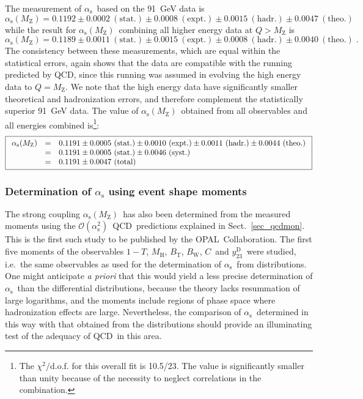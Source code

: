 \documentclass[12pt,a4paper,twoside]{article}
\newcommand{\as}     {\ensuremath{\alpha_{\mathrm{s}}}}
\newcommand{\asmz}   {\ensuremath{\alpha_{\mathrm{s}}(\mz)}}
\newcommand{\oaa}    {\ensuremath{\mathcal{O}(\alpha_{\mathrm{s}}^2)}}
\newcommand{\mz}     {\ensuremath{M_{\mathrm{Z}}}}
\newcommand{\bt}     {\ensuremath{B_{\mathrm{T}}}}
\newcommand{\bw}     {\ensuremath{B_{\mathrm{W}}}}
\newcommand{\cp}     {\ensuremath{C}}
\newcommand{\mh}     {\ensuremath{M_{\mathrm{H}}}}
\newcommand{\thr}    {\ensuremath{1-T}}
\newcommand{\ytwothree}   {\ensuremath{y^{\mathrm{D}}_{23}}}
\newcommand{\bm}[1]  {\mbox{\boldmath\ensuremath{#1}}}
\newcommand{\Opal}{\mbox{\rm OPAL}}
\newcommand{\qcd}{\mbox{QCD}}
\newcommand{\dof}{\mbox{d.o.f.}}
\begin{document}
The measurement of \as\ based on the 91~GeV data is
\[
\asmz =  0.1192
\pm0.0002~\mathrm{(stat.)}
\pm0.0008~\mathrm{(expt.)}
\pm0.0015~\mathrm{(hadr.)}
\pm0.0047~\mathrm{(theo.)} 
\]
while the result for \asmz\ combining all 
higher energy data at $Q>\mz$ is
\[
\asmz =  0.1189
\pm0.0011~\mathrm{(stat.)}
\pm0.0015~\mathrm{(expt.)}
\pm0.0008~\mathrm{(hadr.)}
\pm0.0040~\mathrm{(theo.)}\;. 
\]
The consistency between these measurements, which are equal within the 
statistical errors, 
again shows that the data are 
compatible with the running predicted by 
\qcd, since this running was assumed in evolving the
high energy data to $Q=\mz$.  We note that the high energy 
data have significantly smaller theoretical and hadronization
errors, and therefore complement the statistically superior
91~GeV data.
The value of \asmz\ obtained from
all observables and all energies combined 
is\footnote{The $\chi^2/\dof$ for this overall fit is 10.5/23. The value
is significantly smaller than unity because of the necessity to 
neglect correlations in the combination.}:
{\small
\begin{displaymath}
\fbox{$\begin{array}{rcl}
\asmz & = & 0.1191
\pm0.0005~\mathrm{(stat.)}
\pm0.0010~\mathrm{(expt.)}
\pm0.0011~\mathrm{(hadr.)}
\pm0.0044~\mathrm{(theo.)}\\
& = & 0.1191
\pm0.0005~\mathrm{(stat.)}
\pm0.0046~\mathrm{(syst.)} \\
& = & 0.1191
\pm0.0047~\mathrm{(total)}
\end{array}$}
\end{displaymath}
}
\subsubsection{Determination of \bm{\as} using event shape moments}
\label{sec_alphas_mom}

The strong coupling \asmz\ has also been determined from the measured
moments using the \oaa\ \qcd\
predictions explained in Sect.~\ref{sec_qcdmon}.
This is the first such study to be published by the \Opal\ Collaboration.  
The first five
moments of the observables \mbox{\thr}, \mh, \bt, \bw, \cp\ and \ytwothree\ were
studied, i.e.\ the same observables as used for the
determination of \as\ from distributions. 
One might anticipate {\it a priori} that this would yield a less precise 
determination of \as\ than the differential distributions, 
because the theory lacks resummation of large logarithms,
and the moments include regions of phase space where hadronization effects are
large. Nevertheless, the comparison of \as\ determined in this way with 
that obtained from the distributions should provide an illuminating
test of the adequacy of \qcd\ in this area.
\end{document}
